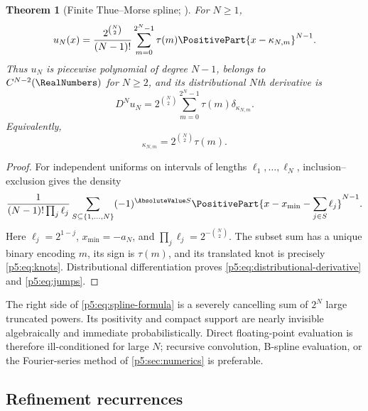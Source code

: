\documentclass[11pt,oneside]{article}
\numberwithin{equation}{section}
\newtheorem{theorem}{Theorem}[section]
\theoremstyle{definition}
\theoremstyle{remark}
\begin{document}
\begin{theorem}[Finite Thue--Morse spline; \baseline]
For $N\ge1$,
\begin{equation}
 u_N(x)=\frac{2^{\binom N2}}{(N-1)!}
 \sum_{m=0}^{2^N-1}\tau(m)\PositivePart{x-\kappa_{N,m}}^{N-1}.
 \label{p5:eq:spline-formula}
\end{equation}
Thus $u_N$ is piecewise polynomial of degree $N-1$, belongs to $C^{N-2}(\RealNumbers)$ for $N\ge2$, and its distributional $N$th derivative is
\begin{equation}
 D^Nu_N=2^{\binom N2}\sum_{m=0}^{2^N-1}\tau(m)\delta_{\kappa_{N,m}}.
 \label{p5:eq:distributional-derivative}
\end{equation}
Equivalently,
\begin{equation}
 [u_N^{(N-1)}]_{\kappa_{N,m}}
 =2^{\binom N2}\tau(m).
 \label{p5:eq:jumps}
\end{equation}
\end{theorem}

\begin{proof}
For independent uniforms on intervals of lengths $\ell_1,\ldots,\ell_N$, inclusion--exclusion gives the density
\[
 \frac1{(N-1)!\prod_j\ell_j}
 \sum_{S\subseteq\{1,\ldots,N\}}(-1)^{\AbsoluteValue S}
 \PositivePart{x-x_{\min}-\sum_{j\in S}\ell_j}^{N-1}.
\]
Here $\ell_j=2^{1-j}$, $x_{\min}=-a_N$, and
$\prod_j\ell_j=2^{-\binom N2}$.  The subset sum has a unique binary encoding $m$, its sign is $\tau(m)$, and its translated knot is precisely \eqref{p5:eq:knots}.  Distributional differentiation proves \eqref{p5:eq:distributional-derivative} and \eqref{p5:eq:jumps}.
\end{proof}

\begin{remark}
The right side of \eqref{p5:eq:spline-formula} is a severely cancelling sum of $2^N$ large truncated powers.  Its positivity and compact support are nearly invisible algebraically and immediate probabilistically.  Direct floating-point evaluation is therefore ill-conditioned for large $N$; recursive convolution, B-spline evaluation, or the Fourier-series method of \cref{p5:sec:numerics} is preferable.
\end{remark}

\subsection{Refinement recurrences}
\end{document}
